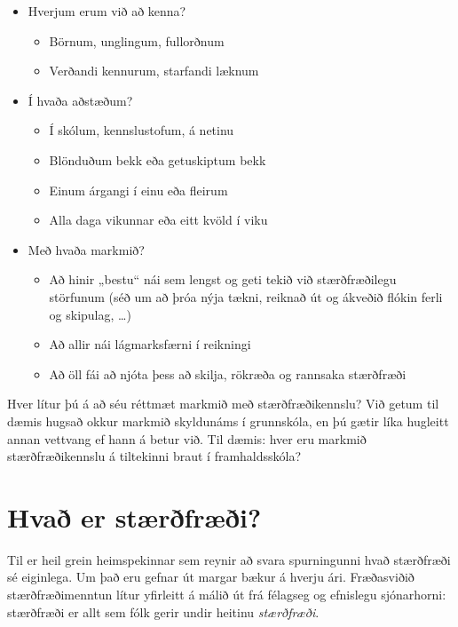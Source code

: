 \documentclass[
  icelandic,
]{book}
\providecommand{\tightlist}{%
  \setlength{\itemsep}{0pt}\setlength{\parskip}{0pt}}
\theoremstyle{definition}
\theoremstyle{definition}
\theoremstyle{definition}
\theoremstyle{definition}
\theoremstyle{remark}
\begin{document}
\begin{itemize}
\tightlist
\item
  Hverjum erum við að kenna?

  \begin{itemize}
  \tightlist
  \item
    Börnum, unglingum, fullorðnum
  \item
    Verðandi kennurum, starfandi læknum
  \end{itemize}
\item
  Í hvaða aðstæðum?

  \begin{itemize}
  \tightlist
  \item
    Í skólum, kennslustofum, á netinu
  \item
    Blönduðum bekk eða getuskiptum bekk
  \item
    Einum árgangi í einu eða fleirum
  \item
    Alla daga vikunnar eða eitt kvöld í viku
  \end{itemize}
\item
  Með hvaða markmið?

  \begin{itemize}
  \tightlist
  \item
    Að hinir „bestu`` nái sem lengst og geti tekið við stærðfræðilegu störfunum (séð um að þróa nýja tækni, reiknað út og ákveðið flókin ferli og skipulag, \ldots)
  \item
    Að allir nái lágmarksfærni í reikningi
  \item
    Að öll fái að njóta þess að skilja, rökræða og rannsaka stærðfræði
  \end{itemize}
\end{itemize}

Hver lítur þú á að séu réttmæt markmið með stærðfræðikennslu? Við getum til dæmis hugsað okkur markmið skyldunáms í grunnskóla, en þú gætir líka hugleitt annan vettvang ef hann á betur við. Til dæmis: hver eru markmið stærðfræðikennslu á tiltekinni braut í framhaldsskóla?

\section{Hvað er stærðfræði?}\label{hvad-stae}

Til er heil grein heimspekinnar sem reynir að svara spurningunni hvað stærðfræði sé eiginlega. Um það eru gefnar út margar bækur á hverju ári. Fræðasviðið stærðfræðimenntun lítur yfirleitt á málið út frá félagseg og efnislegu sjónarhorni: stærðfræði er allt sem fólk gerir undir heitinu \emph{stærðfræði}.
\end{document}
